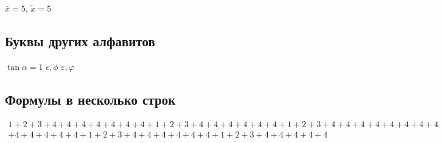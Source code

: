 \documentclass[a4paper,12pt]{article}
\begin{document}
$\bar x = 5$, $\tilde x = 5$

\subsection{Буквы других алфавитов}

$\tan \alpha = 1$
$\epsilon, \phi$
$\varepsilon, \varphi$

\subsection{Формулы в несколько строк}

\begin{multline}
1+2+3+4+4+4+4+4+4+4+1+2+3+4+4+4+4+4+4+1+2+3+4+4+4+4+4+4+4+4\\+4+4+4+4+4+1+2+3+4+4+4+4+4+4+1+2+3+4+4+4+4+4
\end{multline}
\end{document}
